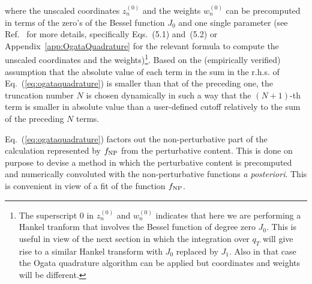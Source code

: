\documentclass[10pt,a4paper]{article}
\begin{document}
where the unscaled coordinates $z_n^{(0)}$ and the weights $w_n^{(0)}$
can be precomputed in terms of the zero's of the Bessel function $J_0$
and one single parameter (see Ref.~\cite{Ogata:quadrature} for more
details, specifically Eqs.~(5.1) and~(5.2) or
Appendix~\ref{app:OgataQuadrature} for the relevant formula to compute
the unscaled coordinates and the weights)\footnote{The superscript 0
  in $z_n^{(0)}$ and $w_n^{(0)}$ indicates that here we are performing
  a Hankel tranform that involves the Bessel function of degree zero
  $J_0$. This is useful in view of the next section in which the
  integration over $q_T$ will give rise to a similar Hankel transform
  with $J_0$ replaced by $J_1$. Also in that case the Ogata quadrature
  algorithm can be applied but coordinates and weights will be
  different.}. Based on the (empirically verified) assumption that the
absolute value of each term in the sum in the r.h.s. of
Eq.~(\ref{eq:ogataquadrature}) is smaller than that of the preceding
one, the truncation number $N$ is chosen dynamically in such a way
that the $(N+1)$-th term is smaller in absolute value than a
user-defined cutoff relatively to the sum of the preceding $N$ terms.

Eq.~(\ref{eq:ogataquadrature}) factors out the non-perturbative part
of the calculation represented by $f_{\rm NP}$ from the perturbative
content. This is done on purpose to devise a method in which the
perturbative content is precomputed and numerically convoluted with
the non-perturbative functions \textit{a posteriori}. This is
convenient in view of a fit of the function $f_{\rm NP}$.
\end{document}
